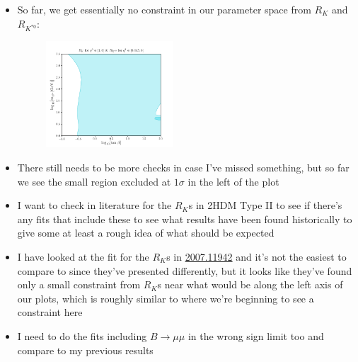\documentclass[11pt]{article}
\begin{document}
\begin{itemize}
    \item So far, we get essentially no constraint in our parameter space from $R_K$ and $R_{K^{*0}}$:
        \begin{figure}[H]
            \centering
            \includegraphics[width=0.45\textwidth]{rks_plot.png}
        \end{figure}
    \item There still needs to be more checks in case I've missed something, but so far we see the small region excluded at $1\sigma$ in the left of the plot
    \item I want to check in literature for the $R_K$s in 2HDM Type II to see if there's any fits that include these to see what results have been found historically to give some at least a rough idea of what should be expected
    \item I have looked at the fit for the $R_K$s in \href{https://arxiv.org/pdf/2007.11942.pdf}{2007.11942} and it's not the easiest to compare to since they've presented differently, but it looks like they've found only a small constraint from $R_K$s near what would be along the left axis of our plots, which is roughly similar to where we're beginning to see a constraint here
    \item I need to do the fits including $B\to\mu\mu$ in the wrong sign limit too and compare to my previous results
\end{itemize}
\end{document}
